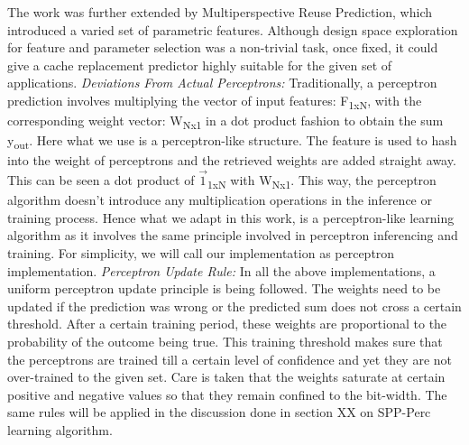 \documentclass{sig-alternate}
\begin{document}
The work was further extended by Multiperspective Reuse Prediction\cite{Multiperspective}, which introduced a varied set of parametric features. 
Although design space exploration for feature and parameter selection was a non-trivial task, once fixed, it could give a cache replacement predictor highly suitable for the given set of applications.
\newline
\newline
\textit{Deviations From Actual Perceptrons:} Traditionally, a perceptron prediction involves multiplying the vector of input features: F\textsubscript{1xN}, with the corresponding weight vector: W\textsubscript{Nx1} in a dot product fashion to obtain the sum y\textsubscript{out}. 
Here what we use is a perceptron-like structure. 
The feature is used to hash into the weight of perceptrons and the retrieved weights are added straight away. 
This can be seen a dot product of $\vec{1}$\textsubscript{1xN} with W\textsubscript{Nx1}. 
This way, the perceptron algorithm doesn't introduce any multiplication operations in the inference or training process. 
Hence what we adapt in this work, is a perceptron-like learning algorithm as it involves the same principle involved in perceptron inferencing and training. 
For simplicity, we will call our implementation as perceptron implementation.
\newline
\newline
\textit{Perceptron Update Rule:} In all the above implementations, a uniform perceptron update principle is being followed. 
The weights need to be updated if the prediction was wrong or the predicted sum does not cross a certain threshold. 
After a certain training period, these weights are proportional to the probability of the outcome being true. 
This training threshold makes sure that the perceptrons are trained till a certain level of confidence and yet they are not over-trained to the given set. 
Care is taken that the weights saturate at certain positive and negative values so that they remain confined to the bit-width. 
The same rules will be applied in the discussion done in section XX on SPP-Perc learning algorithm.
\end{document}
